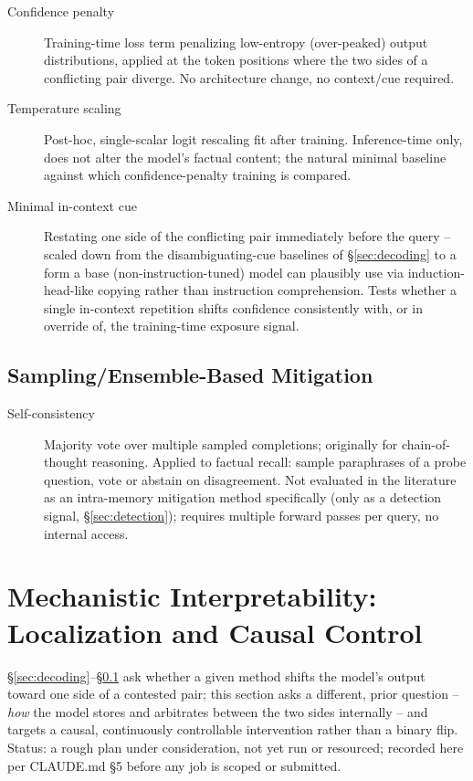 \documentclass[11pt]{article}
\begin{document}
\begin{description}
  \item[Confidence penalty] \citep{pereyra2017regularizing} Training-time loss
    term penalizing low-entropy (over-peaked) output distributions, applied at
    the token positions where the two sides of a conflicting pair diverge. No
    architecture change, no context/cue required.
  \item[Temperature scaling] \citep{guo2017calibration} Post-hoc, single-scalar
    logit rescaling fit after training. Inference-time only, does not alter
    the model's factual content; the natural minimal baseline against which
    confidence-penalty training is compared.
  \item[Minimal in-context cue] Restating one side of the conflicting pair
    immediately before the query -- scaled down from the disambiguating-cue
    baselines of \S\ref{sec:decoding} to a form a base (non-instruction-tuned)
    model can plausibly use via induction-head-like copying rather than
    instruction comprehension. Tests whether a single in-context repetition
    shifts confidence consistently with, or in override of, the training-time
    exposure signal.
\end{description}

\subsection{Sampling/Ensemble-Based Mitigation}
\label{sec:sampling}

\begin{description}
  \item[Self-consistency] \citep{wang2022selfconsistency} Majority vote over
    multiple sampled completions; originally for chain-of-thought reasoning.
    Applied to factual recall: sample paraphrases of a probe question, vote
    or abstain on disagreement. Not evaluated in the literature as an
    intra-memory mitigation method specifically (only as a detection signal,
    \S\ref{sec:detection}); requires multiple forward passes per query, no
    internal access.
\end{description}

\section{Mechanistic Interpretability: Localization and Causal Control}
\label{sec:mechinterp}

\S\ref{sec:decoding}--\S\ref{sec:sampling} ask whether a given method shifts
the model's output toward one side of a contested pair; this section asks a
different, prior question -- \emph{how} the model stores and arbitrates
between the two sides internally -- and targets a causal, continuously
controllable intervention rather than a binary flip. Status: a rough plan
under consideration, not yet run or resourced; recorded here per CLAUDE.md
\S5 before any job is scoped or submitted.
\end{document}
